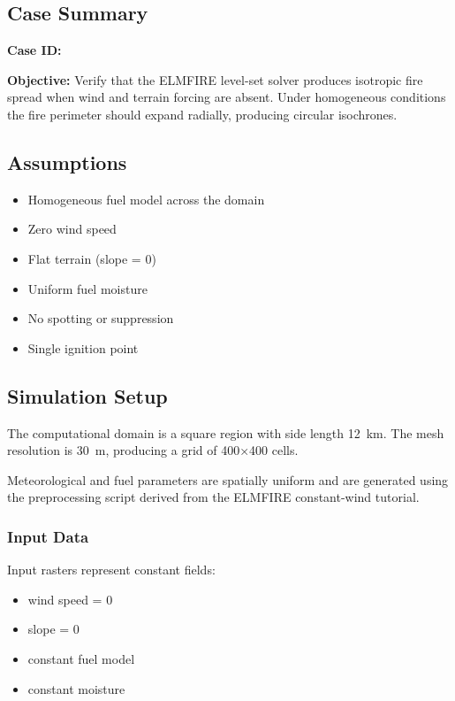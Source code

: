 \documentclass[../report/case_report.tex]{subfiles}
\begin{document}
\subsection*{Case Summary}

\textbf{Case ID:} \CaseID

\textbf{Objective:}
Verify that the ELMFIRE level-set solver produces isotropic fire spread when wind and terrain forcing are absent. Under homogeneous conditions the fire perimeter should expand radially, producing circular isochrones.

\subsection{Assumptions}

\begin{itemize}[nosep]
\item Homogeneous fuel model across the domain
\item Zero wind speed
\item Flat terrain (slope = 0)
\item Uniform fuel moisture
\item No spotting or suppression
\item Single ignition point
\end{itemize}

\subsection{Simulation Setup}

The computational domain is a square region with side length \SI{12}{km}.
The mesh resolution is \SI{30}{m}, producing a grid of 400×400 cells.

Meteorological and fuel parameters are spatially uniform and are generated using the preprocessing script derived from the ELMFIRE constant-wind tutorial.

\subsubsection{Input Data}

Input rasters represent constant fields:

\begin{itemize}
\item wind speed = 0
\item slope = 0
\item constant fuel model
\item constant moisture
\end{itemize}
\end{document}
